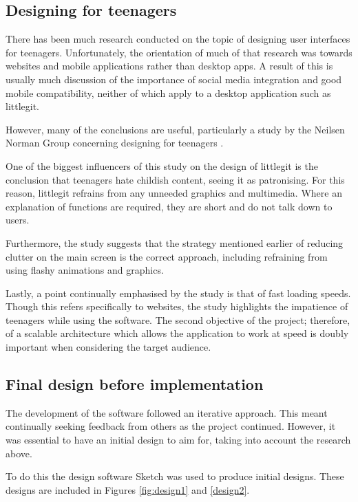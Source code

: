 \subsection {Designing for teenagers}

There has been much research conducted on the topic of designing user interfaces for teenagers. Unfortunately, the orientation of much of that research was towards websites and mobile applications rather than desktop apps. A result of this is usually much discussion of the importance of social media integration and good mobile compatibility, neither of which apply to a desktop application such as littlegit.

However, many of the conclusions are useful, particularly a study by the Neilsen Norman Group concerning designing for teenagers \cite{teendesign}. 

One of the biggest influencers of this study on the design of littlegit is the conclusion that teenagers hate childish content, seeing it as patronising. For this reason, littlegit refrains from any unneeded graphics and multimedia. Where an explanation of functions are required, they are short and do not talk down to users.

Furthermore, the study suggests that the strategy mentioned earlier of reducing clutter on the main screen is the correct approach, including refraining from using flashy animations and graphics.

Lastly, a point continually emphasised by the study is that of fast loading speeds. Though this refers specifically to websites, the study highlights the impatience of teenagers while using the software.  The second objective of the project; therefore, of a scalable architecture which allows the application to work at speed is doubly important when considering the target audience.

\subsection{Final design before implementation}

The development of the software followed an iterative approach. This meant continually seeking feedback from others as the project continued. However, it was essential to have an initial design to aim for, taking into account the research above.

To do this the design software Sketch \cite{sketch,} was used to produce initial designs. These designs are included in Figures \ref{fig:design1} and \ref{design2}.





